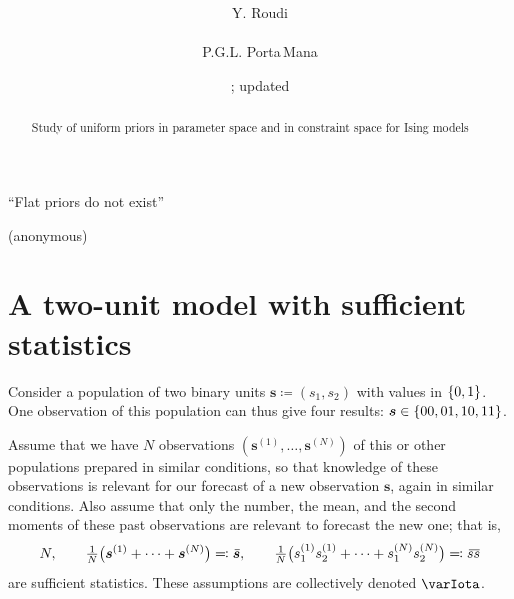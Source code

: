 \documentclass[\ifafour a4paper,12pt,\else a5paper,10pt,\fi%
onecolumn,oneside,article,%
british%
]{memoir}
\title{\propertitle%
}
\author{%
\hspace*{\stretch{1}}\parbox{0.5\linewidth}%
{\protect\centering Y. Roudi\\%
\footnotesize\epost{\email{yasser.roudi}{ntnu.no}}}%
\hspace*{\stretch{1}}\parbox{0.5\linewidth}%
{\protect\centering P.G.L. Porta\,Mana\\%
\footnotesize\epost{\email{piero.mana}{ntnu.no}}}%
\hspace*{\stretch{1}}%
}
\date{\firstdraft; updated \updated}
\theoremstyle{remark}
\theoremstyle{innote}
\newcommand*{\asudedication}[1]{%
{\par\centering\textit{#1}\par}}
\newcommand*{\defd}{\coloneqq}
\newcommand*{\defs}{\eqqcolon}
\DeclarePairedDelimiter\set{\{}{\}}
\renewcommand*{\|}{\mathpunct{|}}
\newcommand*{\widebar}[1]{{\mkern1.5mu\skew{2}\overline{\mkern-1.5mu#1\mkern-1.5mu}\mkern 1.5mu}}
\newcommand*{\yI}{\varIota}
\newcommand*{\ys}{\bm{s}}
\newcommand*{\yso}[1]{\ys^{(#1)}}
\newcommand*{\ysso}[1]{s^{(#1)}}
\newcommand*{\yav}{\widebar{\bm{s}}}
\newcommand*{\ycv}{\widebar{ss}}
\begin{document}
\captiondelim{\quad}\captionnamefont{\footnotesize}\captiontitlefont{\footnotesize}
\frenchspacing

\maketitle
\ifpublic
\abstractrunin
\abslabeldelim{}
\renewcommand*{\abstractname}{}
\setlength{\absleftindent}{0pt}
\setlength{\absrightindent}{0pt}
\setlength{\abstitleskip}{-\absparindent}
\begin{abstract}%
  \noindent Study of uniform priors in parameter space and in constraint
  space for Ising models
\end{abstract}\fi

\frenchspacing

\setlength{\epigraphwidth}{.63\columnwidth}
\epigraphfontsize{\footnotesize}
\setlength{\epigraphrule}{0pt}
\epigraph{\enquote{Flat priors do not exist}}{(anonymous)}

\section{A two-unit model with sufficient statistics}
\label{sec:intro}

Consider a population of two binary units $\ys \defd (s_1,s_2)$ with values in
$\set{0,1}$. One observation of this population can thus give four results:
$\ys \in \set{00,01,10,11}$.

Assume that we have $N$ observations $(\yso{1}, \dotsc, \yso{N})$ of this
or other populations prepared in similar conditions, so that knowledge of
these observations is relevant for our forecast of a new observation $\ys$,
again in similar conditions. Also assume that only the number, the mean,
and the second moments of these past observations are relevant to forecast
the new one; that is,
\begin{equation}
  \label{eq:mean_2ndmom}
  N,\qquad
  \tfrac{1}{N}\bigl( \yso{1} + \dotsb + \yso{N} \bigr) \defs \yav,
  \qquad
  \tfrac{1}{N}\bigl( \ysso{1}_1\ysso{1}_2 + \dotsb + \ysso{N}_1 \ysso{N}_2 \bigr)
  \defs \ycv
\end{equation}
are sufficient statistics. These assumptions are collectively denoted
$\yI$.
\end{document}
